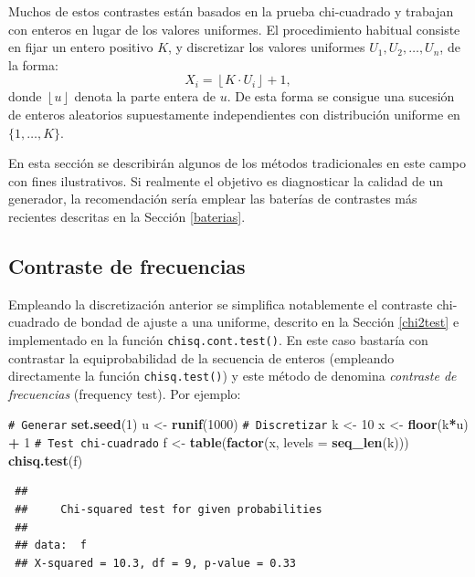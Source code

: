 \documentclass[
  spanish,
  10pt,
]{book}
\newenvironment{Shaded}{\begin{snugshade}}{\end{snugshade}}
\newcommand{\AttributeTok}[1]{\textcolor[rgb]{0.13,0.29,0.53}{#1}}
\newcommand{\CommentTok}[1]{\textcolor[rgb]{0.56,0.35,0.01}{\textit{#1}}}
\newcommand{\DecValTok}[1]{\textcolor[rgb]{0.00,0.00,0.81}{#1}}
\newcommand{\FunctionTok}[1]{\textcolor[rgb]{0.13,0.29,0.53}{\textbf{#1}}}
\newcommand{\NormalTok}[1]{#1}
\newcommand{\OtherTok}[1]{\textcolor[rgb]{0.56,0.35,0.01}{#1}}
\newcommand{\SpecialCharTok}[1]{\textcolor[rgb]{0.81,0.36,0.00}{\textbf{#1}}}
\theoremstyle{break}
\theoremstyle{nonumberplain}
\renewcommand{\CommentTok}[1]{\textcolor[rgb]{0.41,0.41,0.41}{\texttt{#1}}}
\begin{document}
Muchos de estos contrastes están basados en la prueba chi-cuadrado y trabajan con enteros en lugar de los valores uniformes. El procedimiento habitual consiste en fijar un entero positivo \(K\), y discretizar los valores uniformes \(U_{1},U_{2},\ldots,U_{n}\), de la forma:
\[X_i = \left\lfloor K\cdot U_{i}\right\rfloor + 1 ,\]
donde \(\left\lfloor u\right\rfloor\) denota la parte entera de \(u\).
De esta forma se consigue una sucesión de enteros aleatorios supuestamente independientes con distribución uniforme en \(\{1, \ldots, K\}\).

En esta sección se describirán algunos de los métodos tradicionales en este campo con fines ilustrativos. Si realmente el objetivo es diagnosticar la calidad de un generador, la recomendación sería emplear las baterías de contrastes más recientes descritas en la Sección \ref{baterias}.

\subsection{Contraste de frecuencias}\label{freq-test}

Empleando la discretización anterior se simplifica notablemente el contraste chi-cuadrado de bondad de ajuste a una uniforme, descrito en la Sección \ref{chi2test} e implementado en la función \texttt{chisq.cont.test()}.
En este caso bastaría con contrastar la equiprobabilidad de la secuencia de enteros (empleando directamente la función \texttt{chisq.test()}) y este método de denomina \emph{contraste de frecuencias} (frequency test).
Por ejemplo:

\begin{Shaded}
\begin{Highlighting}[]
\CommentTok{\# Generar}
\FunctionTok{set.seed}\NormalTok{(}\DecValTok{1}\NormalTok{)}
\NormalTok{u }\OtherTok{\textless{}{-}} \FunctionTok{runif}\NormalTok{(}\DecValTok{1000}\NormalTok{)}
\CommentTok{\# Discretizar}
\NormalTok{k }\OtherTok{\textless{}{-}} \DecValTok{10}
\NormalTok{x }\OtherTok{\textless{}{-}} \FunctionTok{floor}\NormalTok{(k}\SpecialCharTok{*}\NormalTok{u) }\SpecialCharTok{+} \DecValTok{1}
\CommentTok{\# Test chi{-}cuadrado}
\NormalTok{f }\OtherTok{\textless{}{-}} \FunctionTok{table}\NormalTok{(}\FunctionTok{factor}\NormalTok{(x, }\AttributeTok{levels =} \FunctionTok{seq\_len}\NormalTok{(k)))}
\FunctionTok{chisq.test}\NormalTok{(f)}
\end{Highlighting}
\end{Shaded}

\begin{verbatim}
 ## 
 ##     Chi-squared test for given probabilities
 ## 
 ## data:  f
 ## X-squared = 10.3, df = 9, p-value = 0.33
\end{verbatim}
\end{document}
